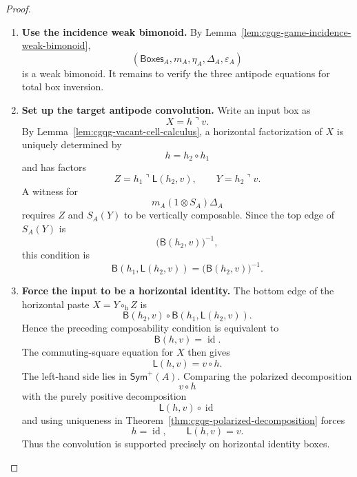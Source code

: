 \documentclass[oneside]{article}
\newcommand{\Boxes}{\mathsf{Boxes}}
\newcommand{\Sym}{\mathsf{Sym}}
\newcommand{\id}{\operatorname{id}}
\newcommand{\trcorner}{\mathbin{\urcorner}}
\newcommand{\leftedge}[2]{\mathsf{L}(#1,#2)}
\newcommand{\bottomedge}[2]{\mathsf{B}(#1,#2)}
\theoremstyle{plain}
\theoremstyle{definition}
\theoremstyle{remark}
\begin{document}
\begin{proof}
    \leavevmode
    \begin{enumerate}[beginpenalty=10000]
        \item \textbf{Use the incidence weak bimonoid.} By Lemma~\ref{lem:cgqg-game-incidence-weak-bimonoid},
        \[
            (\Boxes_A,m_A,\eta_A,\Delta_A,\varepsilon_A)
        \]
        is a weak bimonoid. It remains to verify the three antipode equations for total box inversion.

        \item \textbf{Set up the target antipode convolution.} Write an input box as
        \[
            X=h\trcorner v.
        \]
        By Lemma~\ref{lem:cgqg-vacant-cell-calculus}, a horizontal factorization of \(X\) is uniquely determined by
        \[
            h=h_2\circ h_1
        \]
        and has factors
        \[
            Z
            =
            h_1\trcorner\leftedge{h_2}{v},
            \qquad
            Y
            =
            h_2\trcorner v.
        \]
        A witness for
        \[
            m_A(1\otimes S_A)\Delta_A
        \]
        requires \(Z\) and \(S_A(Y)\) to be vertically composable. Since the top edge of \(S_A(Y)\) is
        \[
            \bigl(\bottomedge{h_2}{v}\bigr)^{-1},
        \]
        this condition is
        \[
            \bottomedge{h_1}{\leftedge{h_2}{v}}
            =
            \bigl(\bottomedge{h_2}{v}\bigr)^{-1}.
        \]

        \item \textbf{Force the input to be a horizontal identity.} The bottom edge of the horizontal paste \(X=Y\circ_{\mathrm h}Z\) is
        \[
            \bottomedge{h_2}{v}
            \circ
            \bottomedge{h_1}{\leftedge{h_2}{v}}.
        \]
        Hence the preceding composability condition is equivalent to
        \[
            \bottomedge{h}{v}=\id.
        \]
        The commuting-square equation for \(X\) then gives
        \[
            \leftedge{h}{v}
            =
            v\circ h.
        \]
        The left-hand side lies in \(\Sym^+(A)\). Comparing the polarized decomposition
        \[
            v\circ h
        \]
        with the purely positive decomposition
        \[
            \leftedge{h}{v}\circ\id
        \]
        and using uniqueness in Theorem~\ref{thm:cgqg-polarized-decomposition} forces
        \[
            h=\id,
            \qquad
            \leftedge{h}{v}=v.
        \]
        Thus the convolution is supported precisely on horizontal identity boxes.


\end{enumerate}
\end{proof}
\end{document}
